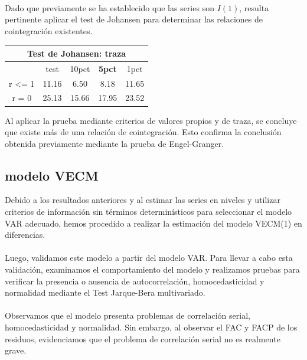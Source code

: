 \documentclass[11pt]{article}
\begin{document}
\begin{minipage}{0.5\textwidth}
\begin{flushleft}
~\\Dado que previamente se ha establecido que las series son $I(1)$, resulta pertinente aplicar el test de Johansen para determinar las relaciones de cointegración existentes.
\end{flushleft}
\end{minipage}
\hfill
\begin{minipage}{0.5\textwidth}
    \centering
    \begin{table}[H]
\centering
\begin{tabular}{|ccccc|}
\hline
\multicolumn{5}{|c|}{\textbf{Test de Johansen: traza }}                                                                                               \\ \hline
\multicolumn{1}{|c|}{}                 & \multicolumn{1}{c|}{test}  & \multicolumn{1}{c|}{10pct} & \multicolumn{1}{c|}{\textbf{5pct}} & 1pct  \\ \hline
\multicolumn{1}{|c|}{r \textless{}= 1} & \multicolumn{1}{c|}{11.16}  & \multicolumn{1}{c|}{6.50}  & \multicolumn{1}{c|}{8.18}          & 11.65 \\ \hline
\multicolumn{1}{|c|}{r = 0}            & \multicolumn{1}{c|}{25.13} & \multicolumn{1}{c|}{15.66} & \multicolumn{1}{c|}{17.95}         & 23.52 \\ \hline
\end{tabular}
\end{table}
\end{minipage}
 Al aplicar la prueba mediante criterios de valores propios y de traza, se concluye que existe más de una relación de cointegración. Esto confirma la conclusión obtenida previamente mediante la prueba de Engel-Granger.
\subsection{modelo VECM}
\begin{flushleft}
    Debido a los resultados anteriores y al estimar las series en niveles y utilizar criterios de información sin términos determinísticos para seleccionar el modelo VAR adecuado, hemos procedido a realizar la estimación del modelo VECM(1) en diferencias.\\~\\

    Luego, validamos este modelo a partir del modelo VAR. Para llevar a cabo esta validación, examinamos el comportamiento del modelo y realizamos pruebas para verificar la presencia o ausencia de autocorrelación, homocedasticidad y normalidad mediante el Test Jarque-Bera multivariado.\\~\\
    
    Observamos que el modelo presenta problemas de correlación serial, homocedasticidad y normalidad. Sin embargo, al observar el FAC y FACP de los residuos, evidenciamos que el problema de correlación serial no es realmente grave.
\end{flushleft}
    
\end{document}
